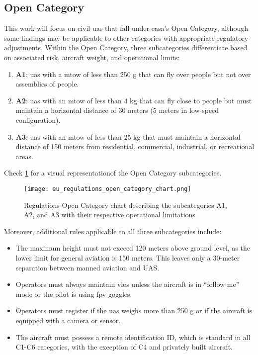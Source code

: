 \subsection{Open Category}
This work will focus on civil \gls{uas} that fall under \gls{easa}'s Open Category, although some findings may be applicable to other categories with appropriate regulatory adjustments. Within the Open Category, three subcategories differentiate based on associated risk, aircraft weight, and operational limits:

\begin{enumerate}
  \item \textbf{A1}: \gls{uas} with a \gls{mtow} of less than 250 g that can fly over people but not over assemblies of people.

  \item \textbf{A2}: \gls{uas} with an \gls{mtow} of less than 4 kg that can fly close to people but must maintain a horizontal distance of 30 meters (5 meters in low-speed configuration).

  \item \textbf{A3}: \gls{uas} with an \gls{mtow} of less than 25 kg that must maintain a horizontal distance of 150 meters from residential, commercial, industrial, or recreational areas.
\end{enumerate}

Check \cref{fig:eu_regulations_open_category_chart} for a visual representationof the Open Category subcategories.

\begin{figure}
  \texttt{[image: eu\_regulations\_open\_category\_chart.png]}
  \caption{ Regulations Open Category chart describing the subcategories A1, A2, and A3 with their respective operational limitations \autocite{ageagleEuropeanUnion}}
  \label{fig:eu_regulations_open_category_chart}
\end{figure}

Moreover, additional rules applicable to all three subcategories include:

\begin{itemize}
  \item The maximum height must not exceed 120 meters above ground level, as the lower limit for general aviation is 150 meters. This leaves only a 30-meter separation between manned aviation and UAS.

  \item Operators must always maintain \gls{vlos} unless the aircraft is in ``follow me'' mode or the pilot is using \gls{fpv} goggles.

  \item Operators must register if the \gls{uas} weighs more than 250 g or if the aircraft is equipped with a camera or sensor.

  \item The aircraft must possess a remote identification ID, which is standard in all C1-C6 categories, with the exception of C4 and privately built aircraft.
\end{itemize}
